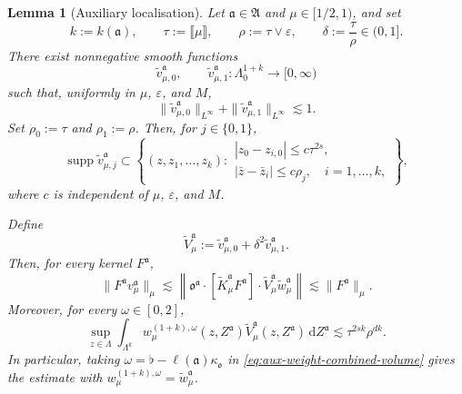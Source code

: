 \documentclass{article}
\numberwithin{equation}{section}
\newcommand{\assign}{:=}
\newcommand{\mathd}{\mathrm{d}}
\theoremstyle{plain}
\newtheorem{lemma}[theorem]{Lemma}
\theoremstyle{definition}
\begin{document}
\begin{lemma}[Auxiliary localisation]
	\label{lem:aux-weight-improved}
	Let $\mathfrak a\in\mathfrak A$ and $\mu\in[1/2,1)$, and set
	\[
	k\assign k(\mathfrak a),
	\qquad
	\tau\assign\llbracket\mu\rrbracket,
	\qquad
		\rho\assign\tau\vee\varepsilon,
		\qquad
		\delta\assign\frac{\tau}{\rho}\in(0,1].
	\]
	There exist nonnegative smooth functions
	\[
	\tilde v_{\mu,0}^{\mathfrak a},
	\qquad
	\tilde v_{\mu,1}^{\mathfrak a}
	\colon\Lambda_0^{1+k}\longrightarrow[0,\infty)
	\]
	such that, uniformly in $\mu$, $\varepsilon$, and $M$,
	\begin{equation}
		\label{eq:aux-weight-combined-Linfty}
		\|\tilde v_{\mu,0}^{\mathfrak a}\|_{L^\infty}
		+\|\tilde v_{\mu,1}^{\mathfrak a}\|_{L^\infty}
		\lesssim1.
	\end{equation}
	Set
	\(\rho_0\assign\tau\) and \(\rho_1\assign\rho\). Then, for \(j\in\{0,1\}\),
	\begin{equation}
		\label{eq:aux-weight-combined-support}
		\operatorname{supp} \tilde v_{\mu,j}^{\mathfrak a}
		\subset \left\{
		(z,z_1,\ldots,z_k):
		\begin{array}{l}
			|z_0-z_{i,0}|\leqslant c\tau^{2s},\\[2pt]
				|\bar z-\bar z_i|\leqslant c\rho_j,
			\quad i=1,\ldots,k,
		\end{array}
		\right\},
	\end{equation}
	where $c$ is independent of $\mu$, $\varepsilon$, and $M$.
	
	Define
	\begin{equation}
		\label{eq:aux-weight-combined-total}
		\tilde V_\mu^{\mathfrak a}
		\assign
		\tilde v_{\mu,0}^{\mathfrak a}
			+\delta^2\tilde v_{\mu,1}^{\mathfrak a}.
	\end{equation}
	Then, for every kernel $F^{\mathfrak a}$,
	\begin{equation}
		\label{eq:aux-weight-combined-bound}
		\|F^{\mathfrak a}v_\mu^{\mathfrak a}\|_\mu
		\lesssim
		\left\|
		\mathfrak o^{\mathfrak a}\cdot
		[\tilde K_\mu^{\mathfrak a}F^{\mathfrak a}]\cdot
		\tilde V_\mu^{\mathfrak a}
		\tilde w_\mu^{\mathfrak a}
		\right\|
		\lesssim
		\|F^{\mathfrak a}\|_\mu.
	\end{equation}
	Moreover, for every $\omega\in[0,2]$,
	\begin{equation}
		\label{eq:aux-weight-combined-volume}
		\sup_{z\in\Lambda}
		\int_{\Lambda^k}
		w_\mu^{(1+k),\omega}(z,Z^{\mathfrak a})
		\tilde V_\mu^{\mathfrak a}(z,Z^{\mathfrak a})
		\,\mathd Z^{\mathfrak a}
		\lesssim
			\tau^{2sk}\rho^{dk}.
	\end{equation}
	In particular, taking
	$\omega=\flat-\ell(\mathfrak a)\kappa_{\mathfrak o}$ in
	\eqref{eq:aux-weight-combined-volume} gives the estimate
	with $w_\mu^{(1+k),\omega}=\tilde w_\mu^{\mathfrak a}$.
\end{lemma}
\end{document}
